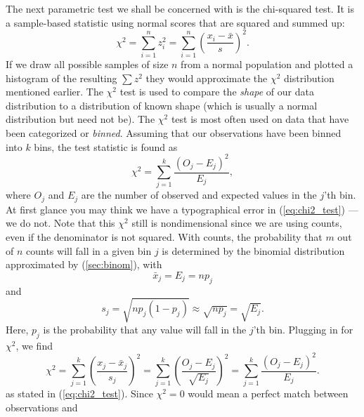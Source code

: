 	The next parametric test we shall be concerned with is the chi-squared test.  It is a sample-based
statistic using normal scores that are squared and summed up:
\begin{equation}
\chi^2=\sum^n_{i=1}z_i^2=\sum^n_{i=1}\left(\frac{x_i-\bar{x}}{s}\right)^2.
\label{eq:ch:2_test}
\end{equation}
If we draw all possible samples of size $n$ from a normal population and plotted a histogram of the resulting $\sum z^2$ they would 
approximate the $\chi^2$ distribution mentioned earlier.  The $\chi^2$ test is used to compare the \emph{shape} of our data 
distribution to a distribution of known shape (which is usually a normal distribution but need not be).
	The $\chi^2$ test is most often used on data that have been categorized or \emph{binned}.  Assuming that 
our observations have been binned into $k$ bins, the test statistic is found as 
\begin{equation}
\chi^2=\sum^k_{j=1}\frac{(O_j-E_j)^2}{E_j},
\label{eq:chi2_test}
\end{equation}
where $O_j$ and $E_j$ are the number of observed and expected values in the $j$'th bin.  At first glance
you may think we have a typographical error in (\ref{eq:chi2_test}) --- we do not.  Note that this $\chi^2$ 
still is nondimensional since we are using counts, even if the denominator is not squared.  With 
counts, the probability that $m$ out of $n$ counts will fall in a given bin $j$ is determined by the 
binomial distribution approximated by (\ref{sec:binom}), with
\begin{equation}
\bar{x}_j = E_j = np_j
\end{equation}
and
\begin{equation}
s_j = \sqrt{np_j (1- p_j)} \approx \sqrt{np_j} = \sqrt{E_j}. 
\end{equation} 	
Here, $p_j$ is the probability that any value will fall in the $j$'th bin.  Plugging in for $\chi^2$, we find
\begin{equation}
\chi^2 = \sum^k_{j=1} \left ( \frac{x_j - \bar{x}_j}{s_j} \right) ^2 =
\sum^k_{j=1} \left( \frac{O_j - E_j}{\sqrt{E_j}} \right) ^2 = \sum^k_{j=1}
\frac{(O_j - E_j)^2}{E_j}.	 
\end{equation}
as stated in (\ref{eq:chi2_test}).  Since $\chi^2 = 0$ would mean a perfect match between observations and
